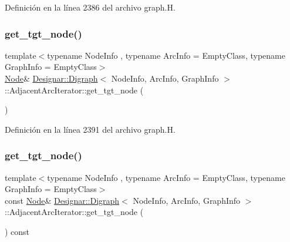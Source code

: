 Definición en la línea 2386 del archivo graph.\+H.

\mbox{\label{class_designar_1_1_digraph_1_1_adjacent_arc_iterator_ad1df4c6624e411ea5ec10ee3d1414b1c}} 
\subsubsection{\texorpdfstring{get\+\_\+tgt\+\_\+node()}{get\_tgt\_node()}\hspace{0.1cm}{\footnotesize\ttfamily [1/2]}}
{\footnotesize\ttfamily template$<$typename Node\+Info , typename Arc\+Info  = Empty\+Class, typename Graph\+Info  = Empty\+Class$>$ \\
\hyperlink{class_designar_1_1_digraph_a4dc921c41a480b7946a04170e997d8ae}{Node}\& \hyperlink{class_designar_1_1_digraph}{Designar\+::\+Digraph}$<$ Node\+Info, Arc\+Info, Graph\+Info $>$\+::Adjacent\+Arc\+Iterator\+::get\+\_\+tgt\+\_\+node (\begin{DoxyParamCaption}{ }\end{DoxyParamCaption})\hspace{0.3cm}{\ttfamily [inline]}}



Definición en la línea 2391 del archivo graph.\+H.

\mbox{\label{class_designar_1_1_digraph_1_1_adjacent_arc_iterator_a3b5e320227b6456e9b0de9d505e0eae4}} 
\subsubsection{\texorpdfstring{get\+\_\+tgt\+\_\+node()}{get\_tgt\_node()}\hspace{0.1cm}{\footnotesize\ttfamily [2/2]}}
{\footnotesize\ttfamily template$<$typename Node\+Info , typename Arc\+Info  = Empty\+Class, typename Graph\+Info  = Empty\+Class$>$ \\
const \hyperlink{class_designar_1_1_digraph_a4dc921c41a480b7946a04170e997d8ae}{Node}\& \hyperlink{class_designar_1_1_digraph}{Designar\+::\+Digraph}$<$ Node\+Info, Arc\+Info, Graph\+Info $>$\+::Adjacent\+Arc\+Iterator\+::get\+\_\+tgt\+\_\+node (\begin{DoxyParamCaption}{ }\end{DoxyParamCaption}) const\hspace{0.3cm}{\ttfamily [inline]}}



